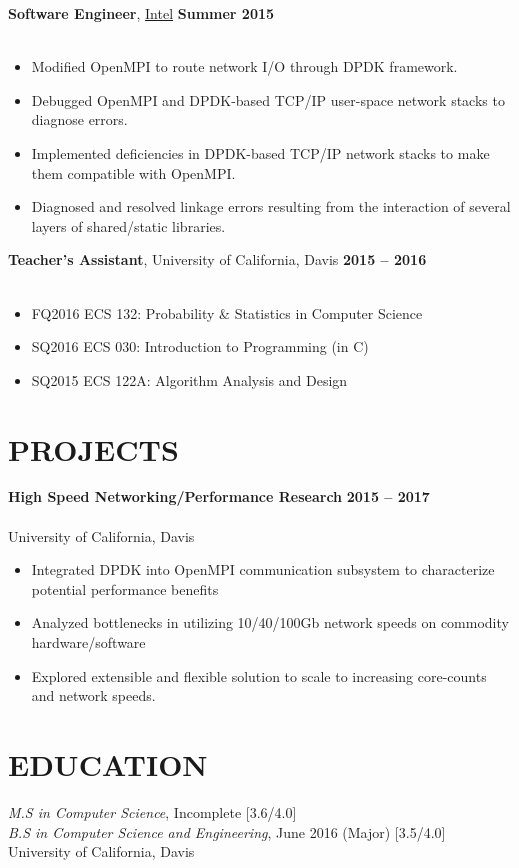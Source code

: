 \documentclass[10pt, center]{res} %
\newcommand{\bullets}[1]{
	\begin{itemize}[noitemsep]
		#1
	\end{itemize}
	\vspace{-6pt}
}
\newcommand{\experience}[5]{
	{\bf #1}, #2 \hfill {\bf #3} \\ \vspace{-10pt}
	\ifx\hfbuzz#4\hfbuzz
		\vspace{-4pt}
	\else
		{\vspace{-4pt} \\ #4}
	\fi
	\bullets{#5}
}
\newcommand{\project}[4]{
	{\bf #1} \hfill {\bf #3} \\ \vspace{-14pt} \\
	{\small #2}
	\bullets{#4}
}
\begin{document}
\begin{resume}
    \experience{Software Engineer}{\href{https://www.intel.com}{Intel}}{Summer 2015}{}{
		\item Modified OpenMPI to route network I/O through DPDK framework.
		\item Debugged OpenMPI and DPDK-based TCP/IP user-space network stacks to diagnose errors.
		\item Implemented deficiencies in DPDK-based TCP/IP network stacks to make them compatible with OpenMPI.
		\item Diagnosed and resolved linkage errors resulting from the interaction of several layers of shared/static libraries.
    }

	\experience{Teacher's Assistant}{University of California, Davis}{2015 -- 2016}{}{
		\item[] \hspace{-12pt} FQ2016 ECS 132: Probability \& Statistics in Computer Science %
		\item[] \hspace{-12pt} SQ2016 ECS 030: Introduction to Programming (in C) %
		\item[] \hspace{-12pt} SQ2015 ECS 122A: Algorithm Analysis and Design %
	}

\section{PROJECTS}
    \project{High Speed Networking/Performance Research}{University of California, Davis}{2015 -- 2017}{
		\item Integrated DPDK into OpenMPI communication subsystem to characterize potential performance benefits
        \item Analyzed bottlenecks in utilizing 10/40/100Gb network speeds on commodity hardware/software
        \item Explored extensible and flexible solution to scale to increasing core-counts and network speeds.
	}

\section{EDUCATION}
{\sl M.S in Computer Science}, Incomplete  \hfill [3.6/4.0]  \\
{\sl B.S in Computer Science and Engineering}, June 2016 \hfill (Major) [3.5/4.0]  \\
University of California, Davis


\end{resume}
\end{document}
